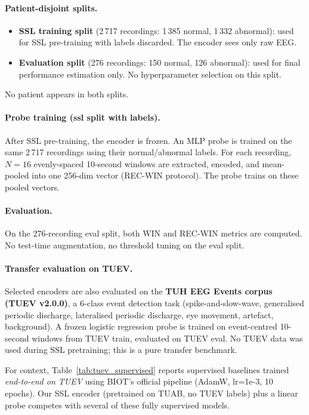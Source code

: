 \documentclass[11pt,a4paper]{article}
\begin{document}
\paragraph{Patient-disjoint splits.}
\begin{itemize}[noitemsep]
  \item \textbf{SSL training split} (2\,717 recordings: 1\,385 normal, 1\,332 abnormal):
    used for SSL pre-training with labels discarded.  The encoder sees only raw EEG.
  \item \textbf{Evaluation split} (276 recordings: 150 normal, 126 abnormal):
    used for final performance estimation only.  No hyperparameter selection on this split.
\end{itemize}
No patient appears in both splits.

\paragraph{Probe training (ssl split with labels).}
After SSL pre-training, the encoder is frozen.  An MLP probe is trained on the same
2\,717 recordings using their normal/abnormal labels.  For each recording, $N{=}16$
evenly-spaced 10-second windows are extracted, encoded, and mean-pooled into one
256-dim vector (REC-WIN protocol).  The probe trains on these pooled vectors.

\paragraph{Evaluation.}
On the 276-recording eval split, both WIN and REC-WIN metrics are computed.
No test-time augmentation, no threshold tuning on the eval split.

\paragraph{Transfer evaluation on TUEV.}
Selected encoders are also evaluated on the \textbf{TUH EEG Events corpus (TUEV v2.0.0)},
a 6-class event detection task (spike-and-slow-wave, generalised periodic discharge,
lateralised periodic discharge, eye movement, artefact, background).
A frozen logistic regression probe is trained on event-centred 10-second windows
from TUEV train, evaluated on TUEV eval.  No TUEV data was used during SSL pretraining;
this is a pure transfer benchmark.

For context, Table~\ref{tab:tuev_supervised} reports supervised baselines trained
\emph{end-to-end on TUEV} using BIOT's official pipeline (AdamW, lr=1e-3, 10 epochs).
Our SSL encoder (pretrained on TUAB, no TUEV labels) plus a linear probe competes
with several of these fully supervised models.
\end{document}

